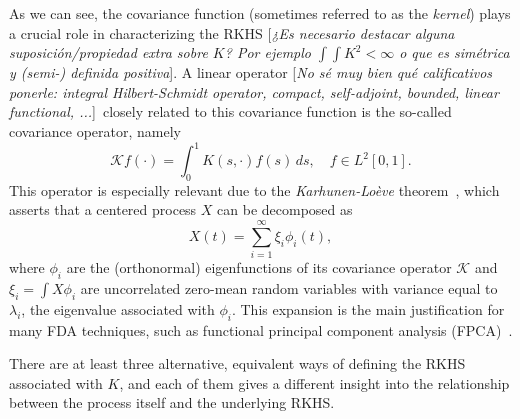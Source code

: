 \documentclass[ba]{imsart}
\numberwithin{equation}{section}
\theoremstyle{plain}
\newcommand\incomment[1]{\color{red}[\textit{#1}]\color{black}}
\begin{document}
As we can see, the covariance function (sometimes referred to as the \textit{kernel}) plays a crucial role in characterizing the RKHS \incomment{¿Es necesario destacar alguna suposición/propiedad extra sobre \(K\)? Por ejemplo \(\int\int K^2 <\infty\) o que es simétrica y (semi-) definida positiva}. A linear operator \incomment{No sé muy bien qué calificativos ponerle: integral Hilbert-Schmidt operator, compact, self-adjoint, bounded, linear functional, ...}\ closely related to this covariance function is the so-called covariance operator, namely
\[
\mathcal Kf(\cdot) = \int_0^1 K(s, \cdot)f(s)\, ds, \quad f \in L^2[0, 1].
\]
This operator is especially relevant due to the \textit{Karhunen-Loève} theorem~\cite[e.g.][Th.~1.5]{bosq2000linear}, which asserts that a centered process \(X\) can be decomposed as
\begin{equation}\label{eq:karhunen-loeve}
X(t) = \sum_{i=1}^\infty \xi_i \phi_i(t),
\end{equation}
where \(\phi_i\) are the (orthonormal) eigenfunctions of its covariance operator \(\mathcal K\) and \(\xi_i = \int X\phi_i\) are uncorrelated zero-mean random variables with variance equal to \(\lambda_i\), the eigenvalue associated with \(\phi_i\). This expansion is the main justification for many FDA techniques, such as functional principal component analysis (FPCA)~\cite[see for example][Ch.~8]{ramsay2005functional}.

There are at least three alternative, equivalent ways of defining the RKHS associated with \(K\), and each of them gives a different insight into the relationship between the process itself and the underlying RKHS.
\end{document}
